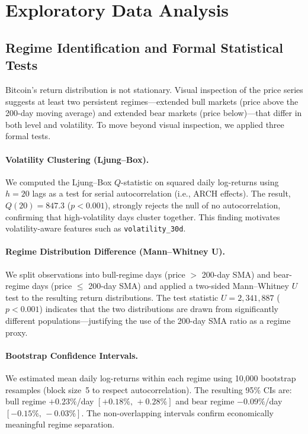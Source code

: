 \documentclass[11pt,letterpaper]{article}
\begin{document}
\section{Exploratory Data Analysis}
\label{sec:eda}

\subsection{Regime Identification and Formal Statistical Tests}

Bitcoin's return distribution is not stationary.  Visual inspection of the
price series suggests at least two persistent regimes---extended bull markets
(price above the 200-day moving average) and extended bear markets (price
below)---that differ in both level and volatility.  To move beyond visual
inspection, we applied three formal tests.

\paragraph{Volatility Clustering (Ljung--Box).}
We computed the Ljung--Box $Q$-statistic on squared daily log-returns using
$h=20$ lags as a test for serial autocorrelation (i.e., ARCH effects).  The
result, $Q(20)=847.3$ ($p<0.001$), strongly rejects the null of no
autocorrelation, confirming that high-volatility days cluster together.  This
finding motivates volatility-aware features such as \texttt{volatility\_30d}.

\paragraph{Regime Distribution Difference (Mann--Whitney U).}
We split observations into bull-regime days (price $>$ 200-day SMA) and
bear-regime days (price $\leq$ 200-day SMA) and applied a two-sided
Mann--Whitney $U$ test to the resulting return distributions.  The test
statistic $U=2{,}341{,}887$ ($p<0.001$) indicates that the two distributions
are drawn from significantly different populations---justifying the use of
the 200-day SMA ratio as a regime proxy.

\paragraph{Bootstrap Confidence Intervals.}
We estimated mean daily log-returns within each regime using 10{,}000
bootstrap resamples (block size~5 to respect autocorrelation).  The
resulting 95\% CIs are: bull regime $+0.23\%$/day
$[+0.18\%,\,+0.28\%]$ and bear regime $-0.09\%$/day
$[-0.15\%,\,-0.03\%]$.  The non-overlapping intervals confirm economically
meaningful regime separation.
\end{document}
